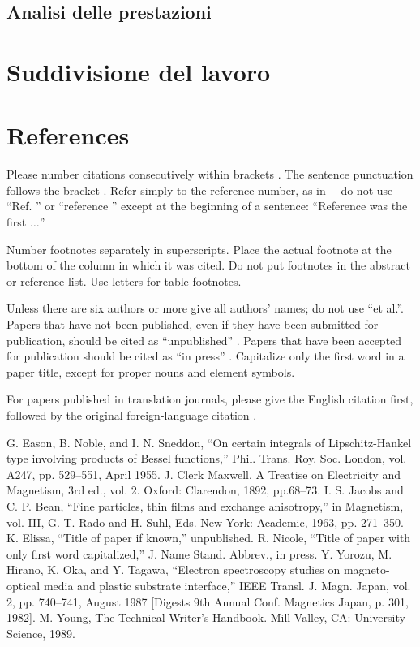 \documentclass[conference]{IEEEtran}
\begin{document}
\subsection{Analisi delle prestazioni}
\section{Suddivisione del lavoro}
\section*{References}

Please number citations consecutively within brackets \cite{b1}. The 
sentence punctuation follows the bracket \cite{b2}. Refer simply to the reference 
number, as in \cite{b3}---do not use ``Ref. \cite{b3}'' or ``reference \cite{b3}'' except at 
the beginning of a sentence: ``Reference \cite{b3} was the first $\ldots$''

Number footnotes separately in superscripts. Place the actual footnote at 
the bottom of the column in which it was cited. Do not put footnotes in the 
abstract or reference list. Use letters for table footnotes.

Unless there are six authors or more give all authors' names; do not use 
``et al.''. Papers that have not been published, even if they have been 
submitted for publication, should be cited as ``unpublished'' \cite{b4}. Papers 
that have been accepted for publication should be cited as ``in press'' \cite{b5}. 
Capitalize only the first word in a paper title, except for proper nouns and 
element symbols.

For papers published in translation journals, please give the English 
citation first, followed by the original foreign-language citation \cite{b6}.

\begin{thebibliography}{00}
 G. Eason, B. Noble, and I. N. Sneddon, ``On certain integrals of Lipschitz-Hankel type involving products of Bessel functions,'' Phil. Trans. Roy. Soc. London, vol. A247, pp. 529--551, April 1955.
 J. Clerk Maxwell, A Treatise on Electricity and Magnetism, 3rd ed., vol. 2. Oxford: Clarendon, 1892, pp.68--73.
 I. S. Jacobs and C. P. Bean, ``Fine particles, thin films and exchange anisotropy,'' in Magnetism, vol. III, G. T. Rado and H. Suhl, Eds. New York: Academic, 1963, pp. 271--350.
 K. Elissa, ``Title of paper if known,'' unpublished.
 R. Nicole, ``Title of paper with only first word capitalized,'' J. Name Stand. Abbrev., in press.
 Y. Yorozu, M. Hirano, K. Oka, and Y. Tagawa, ``Electron spectroscopy studies on magneto-optical media and plastic substrate interface,'' IEEE Transl. J. Magn. Japan, vol. 2, pp. 740--741, August 1987 [Digests 9th Annual Conf. Magnetics Japan, p. 301, 1982].
 M. Young, The Technical Writer's Handbook. Mill Valley, CA: University Science, 1989.
\end{thebibliography}
\vspace{12pt}
\end{document}
